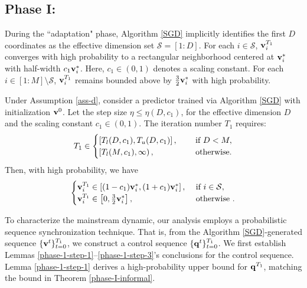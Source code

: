 \subsection{Phase I: }
During the ``adaptation" phase, Algorithm \ref{SGD} implicitly identifies the first $D$ coordinates as the effective dimension set $\mathcal{S} = [1:D]$. For each $i \in \mathcal{S}$, $\mathbf{v}_i^{T_1}$ converges with high probability to a rectangular neighborhood centered at $\mathbf{v}_i^*$ with half-width $c_1\mathbf{v}_i^*$. Here, $c_1 \in (0,1)$ denotes a scaling constant. For each $i\in[1:M]\setminus\mathcal{S}$, $\mathbf{v}_i^{T_1}$ remains bounded above by $\frac{3}{2}\mathbf{v}_i^*$ with high probability.
\begin{theorem}\label{phase-I-informal}
    Under Assumption \ref{ass-d}, consider a predictor trained via Algorithm \ref{SGD} with initialization $\mathbf{v}^0$. Let the step size $\eta\leq\eta(D, c_1)$, for the effective dimension $D$ and the scaling constant $c_1 \in (0,1)$. 
    The iteration number $T_1$ requires:
    \begin{align}
        T_1\in\begin{cases}
        \left[T_l(D, c_1), T_u(D, c_1)\right], \quad &\text{ if }D < M,\notag
        \\
        \left[T_l(M, c_1),\infty\right), \quad &\text{ otherwise}.
    \end{cases}
    \end{align}
    Then, with high probability, we have
    \begin{align}\label{proof-sketch-1}
        \begin{cases}
            \mathbf{v}_i^{T_1}\in\left[(1-c_1)\mathbf{v}_i^{*}, (1+c_1)\mathbf{v}_i^{*}\right], &\text{ if }i\in\mathcal{S},
            \\
            \mathbf{v}_i^{T_1}\in\left[0, \frac{3}{2}\mathbf{v}_i^*\right], &\text{ otherwise }.
        \end{cases}
    \end{align}
\end{theorem}
To characterize the mainstream dynamic, our analysis employs a probabilistic sequence synchronization technique. That is, from the Algorithm \ref{SGD}-generated sequence $\{\mathbf{v}^t\}_{t=0}^{T_1}$, we construct a control sequence $\{\mathbf{q}^t\}_{t=0}^{T_1}$. We first establish Lemmas \ref{phase-1-step-1}--\ref{phase-1-step-3}'s conclusions for the control sequence. Lemma \ref{phase-1-step-1} derives a high-probability upper bound for $\mathbf{q}^{T_1}$, matching the bound in Theorem \ref{phase-I-informal}. 

